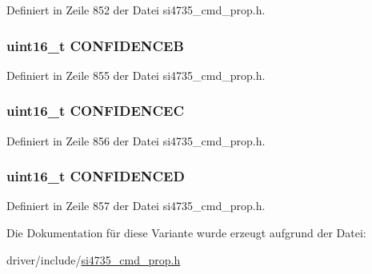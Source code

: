 Definiert in Zeile 852 der Datei si4735\+\_\+cmd\+\_\+prop.\+h.

\hypertarget{unionfm__blend__rssi__mono__thres_ad50cf40b7308de47174d7172846def72}{}
\subsubsection[{C\+O\+N\+F\+I\+D\+E\+N\+C\+E\+B}]{\setlength{\rightskip}{0pt plus 5cm}uint16\+\_\+t C\+O\+N\+F\+I\+D\+E\+N\+C\+E\+B}\label{unionfm__blend__rssi__mono__thres_ad50cf40b7308de47174d7172846def72}


Definiert in Zeile 855 der Datei si4735\+\_\+cmd\+\_\+prop.\+h.

\hypertarget{unionfm__blend__rssi__mono__thres_ab0a4bcb0b2e578ddbbbc4e33767a7df2}{}
\subsubsection[{C\+O\+N\+F\+I\+D\+E\+N\+C\+E\+C}]{\setlength{\rightskip}{0pt plus 5cm}uint16\+\_\+t C\+O\+N\+F\+I\+D\+E\+N\+C\+E\+C}\label{unionfm__blend__rssi__mono__thres_ab0a4bcb0b2e578ddbbbc4e33767a7df2}


Definiert in Zeile 856 der Datei si4735\+\_\+cmd\+\_\+prop.\+h.

\hypertarget{unionfm__blend__rssi__mono__thres_af81bc38f41af0228eb6a646489ad2e3a}{}
\subsubsection[{C\+O\+N\+F\+I\+D\+E\+N\+C\+E\+D}]{\setlength{\rightskip}{0pt plus 5cm}uint16\+\_\+t C\+O\+N\+F\+I\+D\+E\+N\+C\+E\+D}\label{unionfm__blend__rssi__mono__thres_af81bc38f41af0228eb6a646489ad2e3a}


Definiert in Zeile 857 der Datei si4735\+\_\+cmd\+\_\+prop.\+h.



Die Dokumentation für diese Variante wurde erzeugt aufgrund der Datei\+:\begin{DoxyCompactItemize}
\item 
driver/include/\hyperlink{si4735__cmd__prop_8h}{si4735\+\_\+cmd\+\_\+prop.\+h}\end{DoxyCompactItemize}
